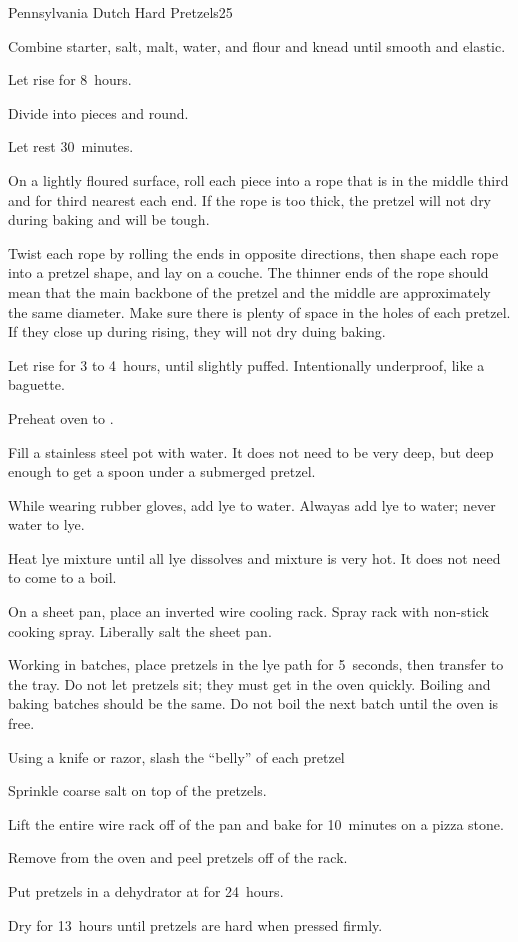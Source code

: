 \begin{recipe}{Pennsylvania Dutch Hard Pretzels}{}{25}
\begin{directions}
\item Combine starter, salt, malt, water, and flour and knead until smooth and elastic.
\item Let rise for 8~hours.
\item Divide into  pieces and round.
\item Let rest 30~minutes.
\item On a lightly floured surface, roll each piece into a rope that is \inch{\half} in the middle third and \inch{\quarter} for third nearest each end. If the rope is too thick, the pretzel will not dry during baking and will be tough.
\item Twist each rope by rolling the ends in opposite directions, then shape each rope into a pretzel shape, and lay on a couche. The thinner ends of the rope should mean that the main backbone of the pretzel and the middle are approximately the same diameter. Make sure there is plenty of space in the holes of each pretzel. If they close up during rising, they will not dry duing baking.
\item Let rise for 3 to 4~hours, until slightly puffed. Intentionally underproof, like a baguette.
\item Preheat oven to .
\item Fill a stainless steel pot with water. It does not need to be very deep, but deep enough to get a spoon under a submerged pretzel.
\item While wearing rubber gloves, add lye to water. Alwayas add lye to water; never water to lye.
\item Heat lye mixture until all lye dissolves and mixture is very hot. It does not need to come to a boil.
\item On a sheet pan, place an inverted wire cooling rack. Spray rack with non-stick cooking spray. Liberally salt the sheet pan.
\item Working in batches, place pretzels in the lye path for 5~seconds, then transfer to the tray. Do not let pretzels sit; they must get in the oven quickly. Boiling and baking batches should be the same. Do not boil the next batch until the oven is free.
\item Using a knife or razor, slash the ``belly'' of each pretzel
\item Sprinkle coarse salt on top of the pretzels.
\item Lift the entire wire rack off of the pan and bake for 10~minutes on a pizza stone.
\item Remove from the oven and peel pretzels off of the rack.
\item Put pretzels in a dehydrator at  for 24~hours.
\item Dry for 13~hours until pretzels are hard when pressed firmly.
\end{directions}


\end{recipe}
